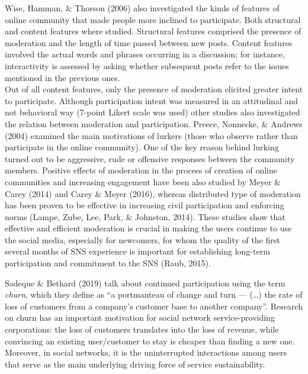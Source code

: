 \documentclass[10pt,dvipsnames]{scrartcl}
\begin{document}
Wise, Hamman, \& Thorson (2006) also investigated the kinds of features
of online community that made people more inclined to participate. Both
structural and content features where studied. Structural features
comprised the presence of moderation and the length of time passed
between new posts. Content features involved the actual words and
phrases occurring in a discussion; for instance, interactivity is
assessed by asking whether subsequent posts refer to the issues
mentioned in the previous ones.\\
Out of all content features, only the presence of moderation elicited
greater intent to participate. Although participation intent was
measured in an attitudinal and not behavioral way (7-point Likert scale
was used) other studies also investigated the relation between
moderation and participation. Preece, Nonnecke, \& Andrews (2004)
examined the main motivations of lurkers (those who observe rather than
participate in the online community). One of the key reason behind
lurking turned out to be aggressive, rude or offensive responses between
the community members. Positive effects of moderation in the process of
creation of online communities and increasing engagement have been also
studied by Meyer \& Carey (2014) and Carey \& Meyer (2016), whereas
distributed type of moderation has been proven to be effective in
increasing civil participation and enforcing norms (Lampe, Zube, Lee,
Park, \& Johnston, 2014). These studies show that effective and
efficient moderation is crucial in making the users continue to use the
social media, especially for newcomers, for whom the quality of the
first several months of SNS experience is important for establishing
long-term participation and commitment to the SNS (Raub, 2015).

Sadeque \& Bethard (2019) talk about continued participation using the
term \textit{churn}, which they define as ``a portmanteau of change and
turn --- (\dots) the rate of loss of customers from a company's customer
base to another company''. Research on churn has an important motivation
for social network service-providing corporations: the loss of customers
translates into the loss of revenue, while convincing an existing
user/customer to stay is cheaper than finding a new one. Moreover, in
social networks, it is the uninterrupted interactions among users that
serve as the main underlying driving force of service sustainability.
\end{document}

